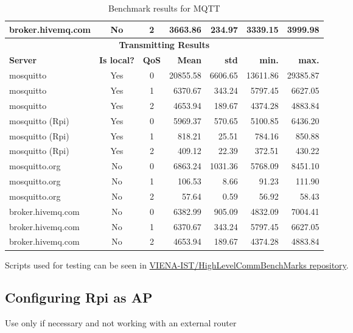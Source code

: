\begin{table}
\begin{tabular}{lccrrrr}
		broker.hivemq.com & No      &2    & 3663.86        &234.97  &3339.15 & 3999.98  \\
		\toprule
		\multicolumn{7}{c}{\textbf{Transmitting Results}}\\
		\textbf{Server} & \textbf{Is local?} & \textbf{QoS} & \textbf{Mean} & \textbf{std} & \textbf{min.} & \textbf{max.}\\
		\toprule
		mosquitto         & Yes     &0    & 20855.58          &6606.65 &13611.86  &29385.87  \\
		mosquitto         & Yes     &1    & 6370.67           &343.24  &5797.45   &6627.05   \\
		mosquitto         & Yes     &2    & 4653.94           &189.67  &4374.28   &4883.84   \\
		\midrule
		mosquitto (Rpi)   & Yes     &0    & 5969.37           &570.65  &5100.85   &6436.20   \\
		mosquitto (Rpi)   & Yes     &1    & 818.21            &25.51   &784.16    &850.88    \\
		mosquitto (Rpi)   & Yes     &2    & 409.12            &22.39   &372.51    &430.22    \\
		\midrule
		mosquitto.org     & No      &0    & 6863.24           &1031.36 &5768.09   &8451.10   \\
		mosquitto.org     & No      &1    & 106.53            & 8.66   &  91.23   & 111.90   \\
		mosquitto.org     & No      &2    & 57.64             & 0.59   &  56.92   & 58.43    \\
		\midrule
		broker.hivemq.com & No      &0    & 6382.99           &905.09  & 4832.09  & 7004.41  \\
		broker.hivemq.com & No      &1    & 6370.67           &343.24  & 5797.45  & 6627.05  \\
		broker.hivemq.com & No      &2    & 4653.94           &189.67  & 4374.28  & 4883.84  \\
		\bottomrule
	\end{tabular}
	\caption{Benchmark results for MQTT}
	\label{tab:mqtt_results}
\end{table}

Scripts used for testing can be seen in \href{https://github.com/VIENA-IST/HighLevelCommBenchMarks}{VIENA-IST/HighLevelCommBenchMarks repository}.

\subsection{Configuring Rpi as AP}
\colorbox{red!15}{Use only if necessary and not working with an external router}

